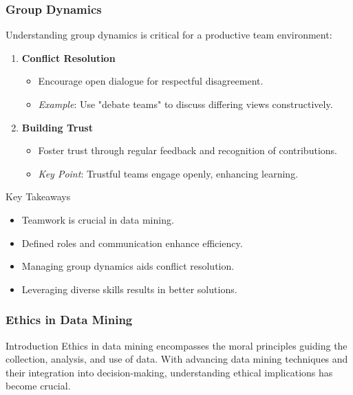 \documentclass[aspectratio=169]{beamer}
\begin{document}
\begin{frame}[fragile]
    \frametitle{Group Dynamics}
    Understanding group dynamics is critical for a productive team environment:
    \begin{enumerate}
        \item \textbf{Conflict Resolution}
        \begin{itemize}
            \item Encourage open dialogue for respectful disagreement.
            \item \textit{Example}: Use "debate teams" to discuss differing views constructively.
        \end{itemize}
        \item \textbf{Building Trust}
        \begin{itemize}
            \item Foster trust through regular feedback and recognition of contributions.
            \item \textit{Key Point}: Trustful teams engage openly, enhancing learning.
        \end{itemize}
    \end{enumerate}
    \begin{block}{Key Takeaways}
        \begin{itemize}
            \item Teamwork is crucial in data mining.
            \item Defined roles and communication enhance efficiency.
            \item Managing group dynamics aids conflict resolution.
            \item Leveraging diverse skills results in better solutions.
        \end{itemize}
    \end{block}
\end{frame}

\begin{frame}[fragile]
    \frametitle{Ethics in Data Mining}
    \begin{block}{Introduction}
        Ethics in data mining encompasses the moral principles guiding the collection, analysis, and use of data. With advancing data mining techniques and their integration into decision-making, understanding ethical implications has become crucial.
    \end{block}
\end{frame}
\end{document}

